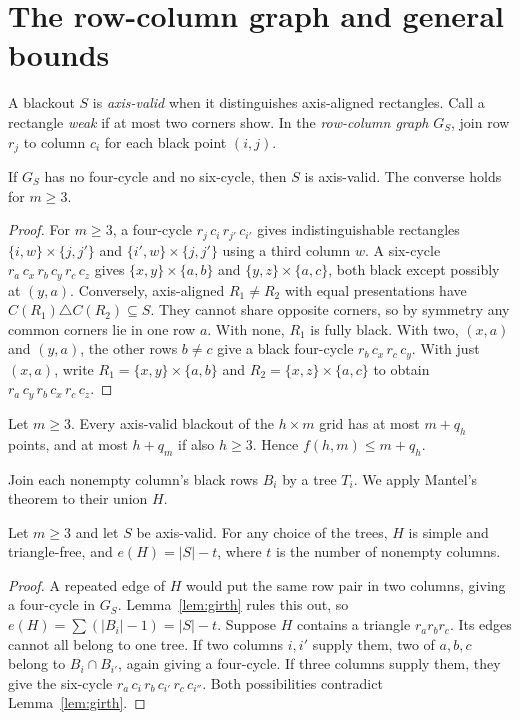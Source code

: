 \section{The row-column graph and general bounds}\label{sec:graph}

A blackout $S$ is \emph{axis-valid} when it distinguishes axis-aligned
rectangles. Call a rectangle \emph{weak} if at most two corners show.
In the \emph{row-column graph} $G_S$, join row $r_j$ to column $c_i$
for each black point $(i,j)$.

\begin{lemma}\label{lem:girth}
If $G_S$ has no four-cycle and no six-cycle, then $S$ is axis-valid. The converse holds for $m\ge3$.
\end{lemma}

\begin{proof}
For $m\ge3$, a four-cycle $r_j\,c_i\,r_{j'}\,c_{i'}$ gives
indistinguishable rectangles $\{i,w\}\times\{j,j'\}$ and
$\{i',w\}\times\{j,j'\}$ using a third column $w$.
A six-cycle $r_a\,c_x\,r_b\,c_y\,r_c\,c_z$ gives
$\{x,y\}\times\{a,b\}$ and $\{y,z\}\times\{a,c\}$, both black
except possibly at $(y,a)$.
Conversely, axis-aligned $R_1\ne R_2$ with equal presentations have
$C(R_1)\triangle C(R_2)\subseteq S$. They cannot share opposite corners,
so by symmetry any common corners lie in one row $a$.
With none, $R_1$ is fully black. With two, $(x,a)$ and $(y,a)$,
the other rows $b\ne c$ give a black four-cycle $r_b\,c_x\,r_c\,c_y$.
With just $(x,a)$, write $R_1=\{x,y\}\times\{a,b\}$ and
$R_2=\{x,z\}\times\{a,c\}$ to obtain
$r_a\,c_y\,r_b\,c_x\,r_c\,c_z$.
\end{proof}

\begin{theorem}\label{thm:rowbound}
Let $m\ge3$. Every axis-valid blackout of the $h\times m$ grid has at most $m+q_h$ points, and at most $h+q_m$ if also $h\ge3$. Hence $f(h,m)\le m+q_h$.
\end{theorem}

Join each nonempty column's black rows $B_i$ by a tree $T_i$.
We apply Mantel's theorem to their union $H$.

\begin{lemma}\label{lem:H}
Let $m\ge3$ and let $S$ be axis-valid. For any choice of the trees, $H$ is simple and triangle-free, and $e(H)=|S|-t$, where $t$ is the number of nonempty columns.
\end{lemma}

\begin{proof}
A repeated edge of $H$ would put the same row pair in two columns,
giving a four-cycle in $G_S$. Lemma~\ref{lem:girth} rules this out, so
$e(H)=\sum(|B_i|-1)=|S|-t$.
Suppose $H$ contains a triangle $r_ar_br_c$. Its edges cannot all
belong to one tree. If two columns $i,i'$ supply them, two of $a,b,c$
belong to $B_i\cap B_{i'}$, again giving a four-cycle. If three columns
supply them, they give the six-cycle
$r_a\,c_i\,r_b\,c_{i'}\,r_c\,c_{i''}$. Both possibilities contradict
Lemma~\ref{lem:girth}.
\end{proof}

